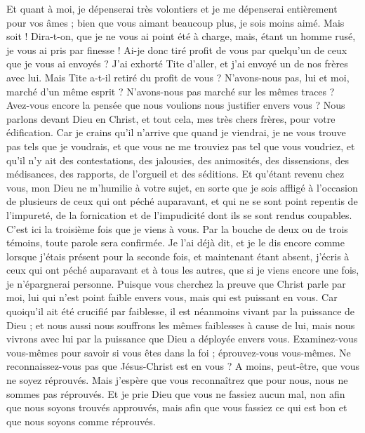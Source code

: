\begin{multicols}{2}
Et quant à moi, je dépenserai très volontiers et je me dépenserai entièrement pour vos âmes ; bien que vous aimant beaucoup plus, je sois moins aimé. 
Mais soit ! Dira-t-on, que je ne vous ai point été à charge, mais, étant un homme rusé, je vous ai pris par finesse !
Ai-je donc tiré profit de vous par quelqu'un de ceux que je vous ai envoyés ?
J'ai exhorté Tite d'aller, et j'ai envoyé un de nos frères avec lui. Mais Tite a-t-il retiré du profit de vous ? N'avons-nous pas, lui et moi, marché d'un même esprit ? N'avons-nous pas marché sur les mêmes traces ?
Avez-vous encore la pensée que nous voulions nous justifier envers vous ? Nous parlons devant Dieu en Christ, et tout cela, mes très chers frères, pour votre édification.
Car je crains qu'il n'arrive que quand je viendrai, je ne vous trouve pas tels que je voudrais, et que vous ne me trouviez pas tel que vous voudriez, et qu'il n'y ait des contestations, des jalousies, des animosités, des dissensions, des médisances, des rapports, de l'orgueil et des séditions.
Et qu'étant revenu chez vous, mon Dieu ne m'humilie à votre sujet, en sorte que je sois affligé à l'occasion de plusieurs de ceux qui ont péché auparavant, et qui ne se sont point repentis de l'impureté, de la fornication et de l'impudicité dont ils se sont rendus coupables.
\VerseOne{}C'est ici la troisième fois que je viens à vous. Par la bouche de deux ou de trois témoins, toute parole sera confirmée.
Je l'ai déjà dit, et je le dis encore comme lorsque j'étais présent pour la seconde fois, et maintenant étant absent, j'écris à ceux qui ont péché auparavant et à tous les autres, que si je viens encore une fois, je n'épargnerai personne.
Puisque vous cherchez la preuve que Christ parle par moi, lui qui n'est point faible envers vous, mais qui est puissant en vous.
Car quoiqu'il ait été crucifié par faiblesse, il est néanmoins vivant par la puissance de Dieu ; et nous aussi nous souffrons les mêmes faiblesses à cause de lui, mais nous vivrons avec lui par la puissance que Dieu a déployée envers vous.
Examinez-vous vous-mêmes pour savoir si vous êtes dans la foi ; éprouvez-vous vous-mêmes. Ne reconnaissez-vous pas que Jésus-Christ est en vous ? A moins, peut-être, que vous ne soyez réprouvés.
Mais j'espère que vous reconnaîtrez que pour nous, nous ne sommes pas réprouvés.
Et je prie Dieu que vous ne fassiez aucun mal, non afin que nous soyons trouvés approuvés, mais afin que vous fassiez ce qui est bon et que nous soyons comme réprouvés.

\end{multicols}
